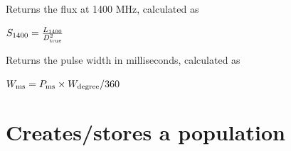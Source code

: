 \documentclass[letterpaper,10pt,english]{sphinxmanual}
\begin{document}

\begin{fulllineitems}
\label{\detokenize{module-level-docs:pulsar.Pulsar.s_1400}}
\pysigstartsignatures
\pysiglinewithargsret
{}
{}
{}
\pysigstopsignatures
\sphinxAtStartPar
Returns the flux at 1400 MHz, calculated as

\sphinxAtStartPar
\(S_{\rm{1400}} = \frac{L_{\rm{1400}}}{D_{\rm{true}}^2}\)

\end{fulllineitems}


\begin{fulllineitems}
\label{\detokenize{module-level-docs:pulsar.Pulsar.width_ms}}
\pysigstartsignatures
\pysiglinewithargsret
{}
{}
{}
\pysigstopsignatures
\sphinxAtStartPar
Returns the pulse width in milliseconds, calculated as

\sphinxAtStartPar
\(W_{\rm{ms}} = P_{\rm{ms}} \times W_{\rm{degree}} / 360\)

\end{fulllineitems}



\section{{\hyperref[\detokenize{module-level-docs:module-population}]{}} \textendash{} Creates/stores a population}
\label{\detokenize{module-level-docs:module-population}}\label{\detokenize{module-level-docs:population-creates-stores-a-population}}\label{\detokenize{module-level-docs:population-module-docs}}

\begin{fulllineitems}
\label{\detokenize{module-level-docs:population.Population}}
\pysigstartsignatures
\pysigline
{}
\pysigstopsignatures
\end{fulllineitems}
\end{document}
